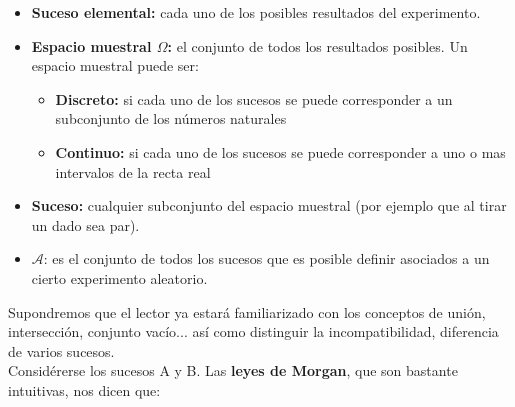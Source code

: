 \documentclass[12pt,a4paper]{book}
\begin{document}
\begin{itemize}

\item \textbf{Suceso elemental:} cada uno de los posibles resultados del experimento.

\item \textbf{Espacio muestral $\Omega$:} el conjunto de todos los resultados posibles. Un espacio muestral puede ser:

	\begin{itemize}
	
	\item \textbf{Discreto:} si cada uno de los sucesos se puede 				corresponder a un subconjunto de los números naturales
	
	\item \textbf{Continuo:} si cada uno de los sucesos se puede 				corresponder a uno o mas intervalos de la recta real
	
	\end{itemize}

\item \textbf{Suceso:} cualquier subconjunto del espacio muestral (por ejemplo que al tirar un dado sea par).

\item $\mathcal{A}$: es el conjunto de todos los sucesos que es posible definir asociados a un cierto experimento aleatorio.

\end{itemize}

Supondremos que el lector ya estará familiarizado con los conceptos de unión, intersección, conjunto vacío... así como distinguir la incompatibilidad, diferencia de varios sucesos. \\

Considérerse los sucesos A y B. Las \textbf{leyes de Morgan}, que son bastante intuitivas, nos dicen que:
\end{document}
